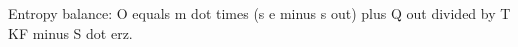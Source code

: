 Entropy balance:  
O equals m dot times (s e minus s out) plus Q out divided by T KF minus S dot erz.
